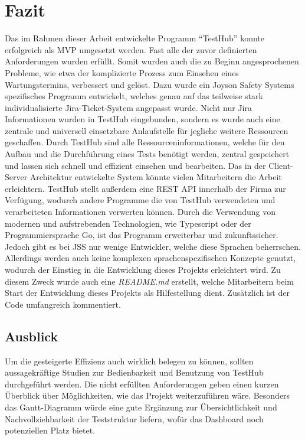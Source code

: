 \section{Fazit}

Das im Rahmen dieser Arbeit entwickelte Programm ``TestHub'' konnte erfolgreich 
als \gls{MVP} umgesetzt werden. Fast alle der zuvor definierten Anforderungen wurden
erfüllt. Somit wurden auch die zu Beginn angesprochenen Probleme, wie etwa der 
komplizierte Prozess zum Einsehen eines Wartungstermins, verbessert und gelöst.
Dazu wurde ein Joyson Safety Systems spezifisches Programm entwickelt, welches
genau auf das teilweise stark individualisierte Jira-Ticket-System angepasst wurde. 
Nicht nur \gls{Jira} Informationen wurden in TestHub eingebunden, sondern es wurde auch 
eine zentrale und universell einsetzbare Anlaufstelle für jegliche weitere
Ressourcen geschaffen. Durch TestHub sind alle Ressourceninformationen, welche
für den Aufbau und die Durchführung eines Tests benötigt werden, zentral gespeichert 
und lassen sich schnell und effizient einsehen und bearbeiten. Das in der 
Client-Server Architektur entwickelte System könnte vielen Mitarbeitern
die Arbeit erleichtern. TestHub stellt außerdem eine \gls{REST} \gls{API} innerhalb der Firma 
zur Verfügung, wodurch andere Programme die von TestHub verwendeten und verarbeiteten 
Informationen verwerten können. Durch die Verwendung von modernen und aufstrebenden Technologien,
wie Typescript oder der Programmiersprache Go, ist das Programm erweiterbar 
und zukunftssicher.\\

Jedoch gibt es bei \gls{JSS} nur wenige Entwickler, welche diese Sprachen beherrschen.
Allerdings werden auch keine komplexen sprachenspezifischen Konzepte genutzt, wodurch
der Einstieg in die Entwicklung dieses Projekts erleichtert wird. Zu diesem Zweck
wurde auch eine \textit{README.md} erstellt, welche Mitarbeitern beim Start der
Entwicklung dieses Projekts als Hilfestellung dient. Zusätzlich ist der Code umfangreich kommentiert.

\subsection{Ausblick}
Um die gesteigerte Effizienz auch wirklich belegen zu können, sollten aussagekräftige
Studien zur Bedienbarkeit und Benutzung von TestHub durchgeführt werden.
Die nicht erfüllten Anforderungen geben einen kurzen Überblick über Möglichkeiten,
wie das Projekt weiterzuführen wäre. Besonders das Gantt-Diagramm würde eine gute Ergänzung
zur Übersichtlichkeit und Nachvollziehbarkeit der Teststruktur liefern, wofür
das Dashboard noch potenziellen Platz bietet.

